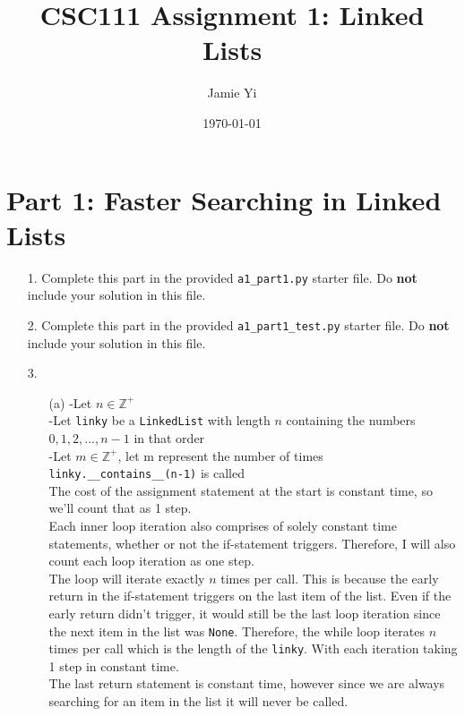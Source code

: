 \documentclass[fontsize=11pt]{article}
\title{CSC111 Assignment 1: Linked Lists}
\author{Jamie Yi}
\date{\today}
\begin{document}
\maketitle

\section*{Part 1: Faster Searching in Linked Lists}

\begin{enumerate}

\item[1.]
Complete this part in the provided \texttt{a1\_part1.py} starter file.
Do \textbf{not} include your solution in this file.

\item[2.]
Complete this part in the provided \texttt{a1\_part1\_test.py} starter file.
Do \textbf{not} include your solution in this file.

\item[3.]
\begin{enumerate}

    \item[(a)]
    -Let $n \in \mathbb{Z}^+$ \\
    -Let \texttt{linky} be a \texttt{LinkedList} with length $n$ containing the numbers $0, 1, 2,..., n-1$ in that order \\
    -Let $m \in \mathbb{Z}^+$, let m represent the number of times \texttt{linky.\_\_contains\_\_(n-1)} is called \\

    The cost of the assignment statement at the start is constant time, so we'll count that as 1 step.\\

    Each inner loop iteration also comprises of solely constant time statements, whether or not the if-statement triggers. Therefore, I will also count each loop iteration as one step.\\
    The loop will iterate exactly $n$ times per call. This is because the early return in the if-statement triggers on the last item of the list. Even if the early return didn't trigger, it would still be the last loop iteration since the next item in the list was \texttt{None}. Therefore, the while loop iterates $n$ times per call which is the length of the \texttt{linky}. With each iteration taking 1 step in constant time.\\

    The last return statement is constant time, however since we are always searching for an item in the list it will never be called.\\


\end{enumerate}
\end{enumerate}
\end{document}
